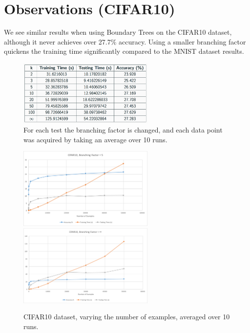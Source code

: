 \documentclass[10pt,letterpaper]{article}
\begin{document}
		
		\section{Observations (CIFAR10)}
		\hspace{5mm}We see similar results when using Boundary Trees on the CIFAR10 dataset, although it never achieves over 27.7$\%$ accuracy. Using a smaller branching factor quickens the training time significantly compared to the MNIST dataset results.
		
		\begin{figure}[H]
			\caption{For each test the branching factor is changed, and each data point was acquired by taking an average over 10 runs.}
			\centering
			\includegraphics[width=0.60\textwidth]{cifar10_varying_k.png}
		\end{figure}
		
		\begin{figure}[H]
		\caption{CIFAR10 dataset, varying the number of examples, averaged over 10 runs.}
		\centering
		\includegraphics[width=0.60\textwidth]{cifar10k5.png}
		\includegraphics[width=0.60\textwidth]{cifar10kinfinity.png}
		\end{figure}
		
\end{document}
